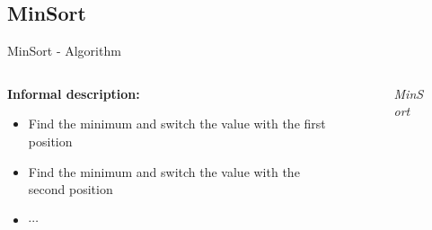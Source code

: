 \subsection{MinSort}

\begin{frame}{MinSort - Algorithm}
  \begin{columns}
    \begin{column}{0.5\textwidth}
      \textbf{Informal description:}
      \begin{itemize}
        \item
          Find the minimum and switch the value with the
          {\color{Mittel-Blau}first} position
        \item
          Find the minimum and switch the value with the
          {\color{Mittel-Blau}second} position
        \item
          $\cdots$
      \end{itemize}
    \end{column}
    \begin{column}{0.5\textwidth}
      \begin{figure}[!h]%
        \begin{adjustbox}{width=\linewidth}
        \end{adjustbox}
        \caption{\textit{MinSort}}%
        \label{fig:minsort_fourth_iteration}%
      \end{figure}%
    \end{column}
  \end{columns}
\end{frame}





